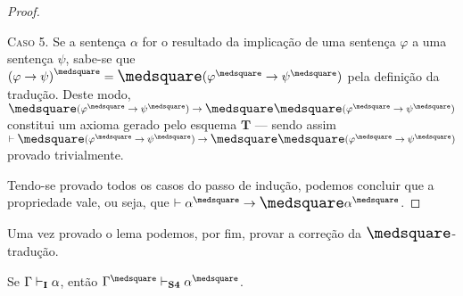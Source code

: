 \begin{lemma}
\begin{proof}
            \begin{case}
                \textsc{Caso 5.}
                Se a sentença $\alpha$ for o resultado da implicação de uma sentença $\varphi$ a uma sentença $\psi$, sabe-se que ${(\varphi\to\psi)}^\medsquare=\nec(\varphi^\medsquare\to\psi^\medsquare)$ pela definição da tradução.
                Deste modo, $\nec(\varphi^\medsquare\to\psi^\medsquare)\to\nec\nec(\varphi^\medsquare\to\psi^\medsquare)$ constitui um axioma gerado pelo esquema \hyperref[MB2]{$\mathbf{T}$} --- sendo assim $\entails\nec(\varphi^\medsquare\to\psi^\medsquare)\to\nec\nec(\varphi^\medsquare\to\psi^\medsquare)$ provado trivialmente.
            \end{case}
            \vspace{.5\baselineskip}
            Tendo-se provado todos os casos do passo de indução, podemos concluir que a propriedade vale, ou seja, que $\entails\alpha^\medsquare\to\nec\alpha^\medsquare$.
        \end{proof}
    \end{lemma}

    Uma vez provado o lema podemos, por fim, provar a correção da $\nec$-tradução.

    \begin{theorem}\label{square-correctness}
        Se $\Gamma\mathrel{\vdash}_\mathbf{I}\alpha$, então $\Gamma^\medsquare\entails_\mathbf{S4}\alpha^\medsquare$.
    \end{theorem}

